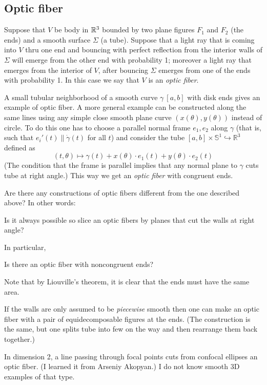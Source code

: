 \subsection*{Optic fiber}

Suppose that $V$ be body in $\mathbb{R}^3$ bounded by two plane figures $F_1$ and $F_2$ (the ends) and a smooth surface $\Sigma$ (a tube).
Suppose that a light ray that is coming into $V$ thru one end and bouncing with perfect reflection from the interior walls of $\Sigma$ will emerge from the other end with probability 1;
moreover a light ray that emerges from the interior of $V$, after bouncing $\Sigma$ emerges from one of the ends with  probability 1.
In this case we say that $V$ is an \emph{optic fiber}.

A small tubular neighborhood of a smooth curve $\gamma\:[a,b]$ with disk ends gives an example of optic fiber.
A more general example can be constructed along the same lines using any simple close smooth plane curve $(x(\theta),y(\theta))$ instead of circle.
To do this one has to choose a  parallel normal frame $e_1,e_2$ along $\gamma$ 
(that is, such that $e_i'(t)\parallel\dot\gamma(t)$ for all $t$) 
and consider the tube $[a,b]\times\mathbb S^1\hookrightarrow\mathbb R^3$ defined as
$$(t,\theta)\mapsto \gamma(t)+x(\theta){\cdot}e_1(t)+y(\theta){\cdot}e_2(t)$$
(The condition that the frame is parallel implies that any normal plane to $\gamma$ cuts tube at right angle.)
This way we get an \emph{optic fiber} with congruent ends.

Are there any constructions of optic fibers different from the one described above? In other words:

\begin{pr}
Is it always possible so slice an optic fibers by planes that cut the walls at right angle?
\end{pr}

In particular, 

\begin{pr}
Is there an optic fiber with noncongruent ends?
\end{pr}

Note that by  Liouville's theorem, it is clear that the ends must have the same area.

If the walls are only assumed to be \emph{piecewise} smooth then one can make an optic fiber with a pair of equidecomposable figures at the ends. (The construction is the same, but one splits tube into few on the way and then rearrange them back together.) 

In dimension 2, a line passing through focal points cuts from confocal ellipses an optic fiber. (I learned it from Arseniy Akopyan.)  I do not know smooth 3D examples of that type.

